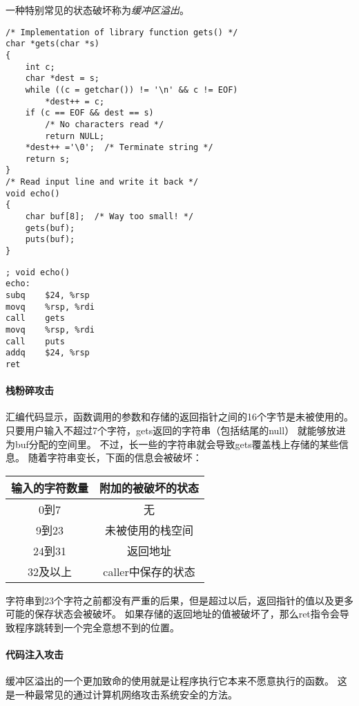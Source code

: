 一种特别常见的状态破坏称为\emph{缓冲区溢出}。
\begin{lstlisting}[style=CStyle]
/* Implementation of library function gets() */
char *gets(char *s)
{
    int c;
    char *dest = s;
    while ((c = getchar()) != '\n' && c != EOF)
        *dest++ = c;
    if (c == EOF && dest == s)
        /* No characters read */
        return NULL;
    *dest++ ='\0';  /* Terminate string */
    return s;
}
/* Read input line and write it back */
void echo()
{
    char buf[8];  /* Way too small! */
    gets(buf);
    puts(buf);
}
\end{lstlisting}
\begin{lstlisting}[style=ASMStyle]
; void echo()
echo:
subq    $24, %rsp
movq    %rsp, %rdi
call    gets
movq    %rsp, %rdi
call    puts
addq    $24, %rsp
ret
\end{lstlisting}
\paragraph{栈粉碎攻击}

汇编代码显示，函数调用的参数和存储的返回指针之间的16个字节是未被使用的。
只要用户输入不超过7个字符，gets返回的字符串（包括结尾的null） 就能够放进为buf分配的空间里。
不过，长一些的字符串就会导致gets覆盖栈上存储的某些信息。
随着字符串变长，下面的信息会被破坏：
\begin{table}[H]
    \centering
    \begin{tabular}{|c|c|}
        \hline
        输入的字符数量 & 附加的被破坏的状态    \\ \hline
        0到7     & 无            \\ \hline
        9到23    & 未被使用的栈空间     \\ \hline
        24到31   & 返回地址         \\ \hline
        32及以上   & caller中保存的状态 \\ \hline
    \end{tabular}
\end{table}

字符串到23个字符之前都没有严重的后果，但是超过以后，返回指针的值以及更多可能的保存状态会被破坏。
如果存储的返回地址的值被破坏了，那么ret指令会导致程序跳转到一个完全意想不到的位置。

\paragraph{代码注入攻击}

缓冲区溢出的一个更加致命的使用就是让程序执行它本来不愿意执行的函数。
这是一种最常见的通过计算机网络攻击系统安全的方法。

